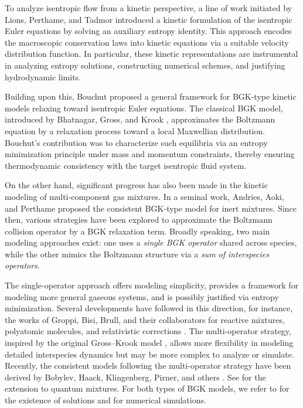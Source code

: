 \documentclass[10pt,reqno]{amsart}
\numberwithin{equation}{section}
\begin{document}
To analyze isentropic flow from a kinetic perspective, a line of work initiated by Lions, Perthame, and Tadmor \cite{LPT91,LPT94,LPT94-2} introduced a kinetic formulation of the isentropic Euler equations by solving an auxiliary entropy identity. This approach encodes the macroscopic conservation laws into kinetic equations via a suitable velocity distribution function. In particular, these kinetic representations are instrumental in analyzing entropy solutions, constructing numerical schemes, and justifying hydrodynamic limits.

Building upon this, Bouchut \cite{B99} proposed a general framework for BGK-type kinetic models relaxing toward isentropic Euler equations. The classical BGK model, introduced by Bhatnagar, Gross, and Krook \cite{BGK54}, approximates the Boltzmann equation by a relaxation process toward a local Maxwellian distribution. Bouchut's contribution was to characterize such equilibria via an entropy minimization principle under mass and momentum constraints, thereby ensuring thermodynamic consistency with the target isentropic fluid system.

On the other hand, significant progress has also been made in the kinetic modeling of multi-component gas mixtures. In a seminal work, Andries, Aoki, and Perthame \cite{AAP02} proposed the consistent BGK-type model for inert mixtures. Since then, various strategies have been explored to approximate the Boltzmann collision operator by a BGK relaxation term. Broadly speaking, two main modeling approaches exist: one uses a \emph{single BGK operator} shared across species, while the other mimics the Boltzmann structure via a \emph{sum of interspecies operators}. 

The single-operator approach offers modeling simplicity, provides a framework for modeling more general gaseous systems, and is possibly justified via entropy minimization. Several developments have followed in this direction, for instance, the works of Groppi, Bisi, Brull, and their collaborators for reactive mixtures, polyatomic molecules, and relativistic corrections  \cite{BMS18,BT20,Brull15,BPS12,GMS11,GRS09,HLY24}. The multi-operator strategy, inspired by the original Gross--Krook model \cite{GK56}, allows more flexibility in modeling detailed interspecies dynamics but may be more complex to analyze or simulate. Recently, the consistent models following the multi-operator strategy have been derived by Bobylev, Haack, Klingenberg, Pirner, and  others \cite{BBGSP18,HHM17,KPP17}. See \cite{BKPY21} for the extension to quantum mixtures. For both types of BGK models, we refer to \cite{BKPY22,KLY21,KP18,Pirner18} for the existence of solutions and \cite{CBGR22,CKP20,GRS18} for numerical simulations.
\end{document}
